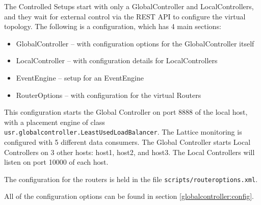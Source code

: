 The Controlled Setups start with only a GlobalController and
LocalControllers, and they wait for external control via the REST API
to configure the virtual topology.
The following is a configuration, which has 4 main sections:

\begin{itemize}
\item GlobalController -- with configuration options for the GlobalController itself
\item LocalController -- with configuration details for LocalControllers
\item EventEngine -- setup for an EventEngine
\item RouterOptions -- with configuration for the virtual Routers
\end{itemize}

\noindent This configuration starts the Global
Controller on port 8888 of the local host,
with a placement engine of class \texttt{usr.globalcontroller.LeastUsedLoadBalancer}.
The Lattice monitoring is configured with 5 different data consumers.
The Global Controller starts
 Local Controllers on 3 other hosts: host1, host2, and host3.
The Local Controllers will listen on
port 10000 of each host.

The configuration for the routers is held in the file
\texttt{scripts/routeroptions.xml}.




\noindent All of the configuration options can be found in section
\ref{globalcontroller:config}.



